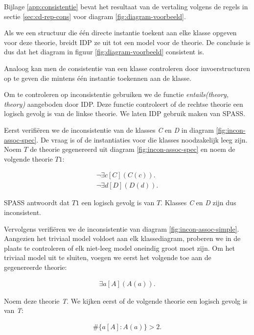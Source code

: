 Bijlage \ref{app:consistentie} bevat het resultaat van de vertaling volgens de regels in sectie \ref{sec:cd-rep-cons} voor diagram \ref{fig:diagram-voorbeeld}.

Als we een structuur die \'e\'en directe instantie toekent aan elke klasse opgeven voor deze theorie, breidt IDP ze uit tot een model voor de theorie. De conclusie is dus dat het diagram in figuur \ref{fig:diagram-voorbeeld} consistent is.

Analoog kan men de consistentie van een klasse controleren door invoerstructuren op te geven die mintens \'e\'en instantie toekennen aan de klasse.

Om te controleren op inconsistentie gebruiken we de functie \textit{entails(theory, theory)} aangeboden door IDP\cite{DeCatBroes2014PLaa}. Deze functie controleert of de rechtse theorie een logisch gevolg is van de linkse theorie. We laten IDP gebruik maken van SPASS\cite{SPASS}.

Eerst verifi\"eren we de inconsistentie van de klasses \textit{C} en \textit{D} in diagram \ref{fig:incon-assoc-spec}. De vraag is of de instantiaties voor die klasses noodzakelijk leeg zijn. Noem $T$ de theorie gegenereerd uit diagram \ref{fig:incon-assoc-spec} en noem de volgende theorie $T1$:

\begin{align*}
	\lnot{}\exists{c}[C](C(c)). \\
	\lnot{}\exists{d}[D](D(d)).
\end{align*}

SPASS antwoordt dat $T1$ een logisch gevolg is van $T$. Klasses \textit{C} en \textit{D} zijn dus inconsistent.

Vervolgens verifi\"eren we de inconsistentie van diagram \ref{fig:incon-assoc-simple}. Aangezien het triviaal model voldoet aan elk klassediagram, proberen we in de plaats te controleren of elk niet-leeg model oneindig groot moet zijn. Om het triviaal model uit te sluiten, voegen we eerst het volgende toe aan de gegenereerde theorie:

\begin{align*}
	\exists{a}[A](A(a)).
\end{align*}

Noem deze theorie \textit{T}. We kijken eerst of de volgende theorie een logisch gevolg is van \textit{T}:

\begin{align*}
	\#\{a [A] : A(a)\} > 2.
\end{align*}

